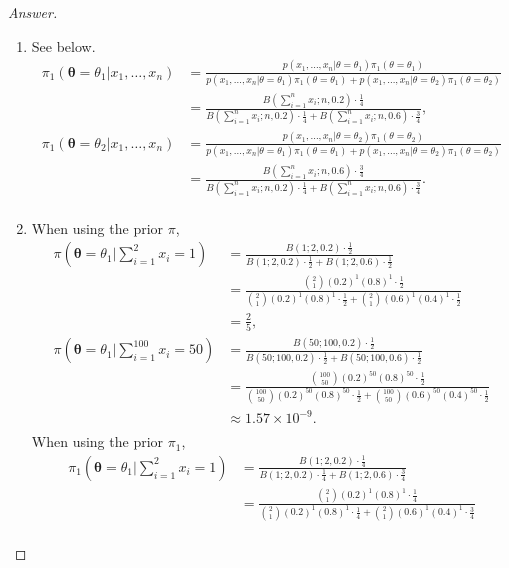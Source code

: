 \documentclass{amsbook}
\theoremstyle{definition}
\theoremstyle{remark}
\numberwithin{section}{chapter}
\numberwithin{equation}{chapter}
\begin{document}
\begin{proof}[Answer]
\begin{enumerate}[label=(\alph*)]
\[\begin{split}
\end{split}
\]
\item See below.\[
\begin{split}
\pi_1(\bm{\theta}=\theta_1|x_1,\dots,x_n)&=\frac{p(x_1,\dots,x_n|\theta=\theta_1)\pi_1(\theta=\theta_1)}{p(x_1,\dots,x_n|\theta=\theta_1)\pi_1(\theta=\theta_1)+p(x_1,\dots,x_n|\theta=\theta_2)\pi_1(\theta=\theta_2)}\\
&=\frac{B(\sum_{i=1}^nx_i;n,0.2)\cdot\frac{1}{4}}{B(\sum_{i=1}^nx_i;n,0.2)\cdot\frac{1}{4} + B(\sum_{i=1}^nx_i;n,0.6)\cdot\frac{3}{4}},\\
\pi_1(\bm{\theta}=\theta_2|x_1,\dots,x_n)&=\frac{p(x_1,\dots,x_n|\theta=\theta_2)\pi_1(\theta=\theta_2)}{p(x_1,\dots,x_n|\theta=\theta_1)\pi_1(\theta=\theta_1)+p(x_1,\dots,x_n|\theta=\theta_2)\pi_1(\theta=\theta_2)}\\
&=\frac{B(\sum_{i=1}^nx_i;n,0.6)\cdot\frac{3}{4}}{B(\sum_{i=1}^nx_i;n,0.2)\cdot\frac{1}{4} + B(\sum_{i=1}^nx_i;n,0.6)\cdot\frac{3}{4}}.\\
\end{split}
\]
\item When using the prior $\pi$,\[
\begin{split}
\pi(\bm{\theta}=\theta_1|\sum_{i=1}^2x_i=1)&=\frac{B(1;2,0.2)\cdot\frac{1}{2}}{B(1;2,0.2)\cdot\frac{1}{2} + B(1;2,0.6)\cdot\frac{1}{2}}\\
&=\frac{\binom{2}{1}(0.2)^{1}(0.8)^{1}\cdot\frac{1}{2}}{\binom{2}{1}(0.2)^{1}(0.8)^{1}\cdot\frac{1}{2} + \binom{2}{1}(0.6)^{1}(0.4)^{1}\cdot\frac{1}{2}}\\
&=\frac{2}{5},\\
\pi(\bm{\theta}=\theta_1|\sum_{i=1}^{100}x_i=50)&=\frac{B(50;100,0.2)\cdot\frac{1}{2}}{B(50;100,0.2)\cdot\frac{1}{2} + B(50;100,0.6)\cdot\frac{1}{2}}\\
&=\frac{\binom{100}{50}(0.2)^{50}(0.8)^{50}\cdot\frac{1}{2}}{\binom{100}{50}(0.2)^{50}(0.8)^{50}\cdot\frac{1}{2} + \binom{100}{50}(0.6)^{50}(0.4)^{50}\cdot\frac{1}{2}}\\
&\approx1.57\times10^{-9}.\\
\end{split}
\]When using the prior $\pi_1$,\[
\begin{split}
\pi_1(\bm{\theta}=\theta_1|\sum_{i=1}^2x_i=1)&=\frac{B(1;2,0.2)\cdot\frac{1}{4}}{B(1;2,0.2)\cdot\frac{1}{4} + B(1;2,0.6)\cdot\frac{3}{4}}\\
&=\frac{\binom{2}{1}(0.2)^{1}(0.8)^{1}\cdot\frac{1}{4}}{\binom{2}{1}(0.2)^{1}(0.8)^{1}\cdot\frac{1}{4} + \binom{2}{1}(0.6)^{1}(0.4)^{1}\cdot\frac{3}{4}}\\

\end{split}\]
\end{enumerate}
\end{proof}
\end{document}
